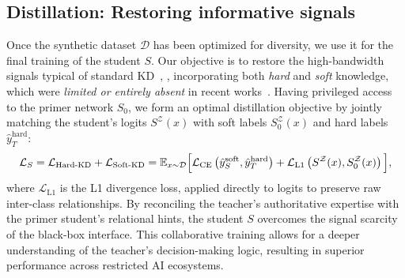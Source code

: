 \subsection{Distillation: Restoring informative signals} \label{ssec:03-framework-distillation}
\begin{foldable}
  Once the synthetic dataset $\mathcal{D}$ has been optimized for diversity, we use it for the final training of the student $S$.
  Our objective is to restore the high-bandwidth signals typical of standard KD~\cite{hinton2015distilling}, \ie, incorporating both \textit{hard} and \textit{soft} knowledge, which were \textit{limited or entirely absent} in recent works~\cite{wang2021zero, zhang2022ideal, yuan2024data}.
  Having privileged access to the primer network $S_0$, we form an optimal distillation objective by jointly matching the student's logits $S^\mathcal{Z}(x)$ with soft labels $S_{0}^\mathcal{Z}(x)$ and hard labels $\hat{y}_{T}^\text{hard}$:
  \begin{equation} \label{eq:loss-kd-total}
    \mathcal{L}_{S}
    = \mathcal{L}_\text{Hard-KD} + \mathcal{L}_\text{Soft-KD} \\
    = \mathbb{E}_{x \sim \mathcal{D}}\Big[
      \mathcal{L}_\text{CE}\left( \hat{y}_{S}^\text{soft}, \hat{y}_{T}^\text{hard} \right) +
      \mathcal{L}_\text{L1}\left( S^\mathcal{Z}(x), S_{0}^\mathcal{Z}(x) \right)
    \Big],
  \end{equation}
  where $\mathcal{L}_\text{L1}$ is the L1 divergence loss, applied directly to logits to preserve raw inter-class relationships.
  By reconciling the teacher's authoritative expertise with the primer student's relational hints, the student $S$ overcomes the signal scarcity of the black-box interface.
  This collaborative training allows for a deeper understanding of the teacher's decision-making logic, resulting in superior performance across restricted AI ecosystems.
\end{foldable}
